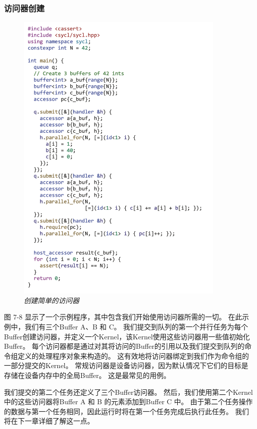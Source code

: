 \subsubsection{访问器创建}
\begin{figure}[H]
	\centering
	\includegraphics[width=0.9\textwidth]{figs/F7.8.png}
	\caption{\textit{创建简单的访问器 }}
\end{figure}

图 7-8 显示了一个示例程序，其中包含我们开始使用访问器所需的一切。 
在此示例中，我们有三个Buffer A、B 和 C。
我们提交到队列的第一个并行任务为每个Buffer创建访问器，并定义一个Kernel，该Kernel使用这些访问器用一些值初始化Buffer。 
每个访问器都是通过对其将访问的Buffer的引用以及我们提交到队列的命令组定义的处理程序对象来构造的。 
这有效地将访问器绑定到我们作为命令组的一部分提交的Kernel。 
常规访问器是设备访问器，因为默认情况下它们的目标是存储在设备内存中的全局Buffer。 这是最常见的用例。

我们提交的第二个任务还定义了三个Buffer访问器。 
然后，我们使用第二个Kernel中的这些访问器将Buffer A 和 B 的元素添加到Buffer C 中。
由于第二个任务操作的数据与第一个任务相同，因此运行时将在第一个任务完成后执行此任务。 
我们将在下一章详细了解这一点。

